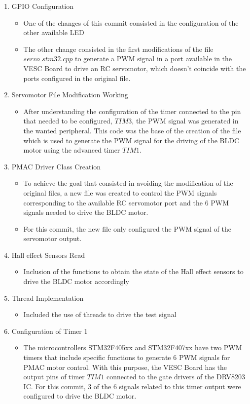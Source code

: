 \begin{enumerate}
	\item GPIO Configuration
		\begin {itemize}
			\item One of the changes of this commit consisted in the configuration of the other available LED
			\item The other change consisted in the first modifications of the file $servo\_stm32.cpp$ to generate a PWM signal in a port available in the VESC Board to drive an RC servomotor, which doesn't coincide with the ports configured in the original file.
		\end {itemize}
	\item Servomotor File Modification Working
		\begin {itemize}
			\item After understanding the configuration of the timer connected to the pin that needed to be configured, $TIM3$, the PWM signal was generated in the wanted peripheral. This code was the base of the creation of the file which is used to generate the PWM signal for the driving of the BLDC motor using the advanced timer $TIM1$.
		\end {itemize}
	\item PMAC Driver Class Creation
		\begin {itemize}
			\item To achieve the goal that consisted in avoiding the modification of the original files, a new file was created to control the PWM signals corresponding to the available RC servomotor port and the 6 PWM signals needed to drive the BLDC motor.
			\item For this commit, the new file only configured the PWM signal of the servomotor output.
		\end {itemize}
	\item Hall effect Sensors Read
		\begin {itemize}
			\item Inclusion of the functions to obtain the state of the Hall effect sensors to drive the BLDC motor accordingly
		\end {itemize}
	\item Thread Implementation
		\begin {itemize}
			\item Included the use of threads to drive the test signal
		\end {itemize}
	\item Configuration of Timer 1
		\begin {itemize}
			\item The microcontrollers STM32F405xx and STM32F407xx have two PWM timers that include specific functions to generate 6 PWM signals for PMAC motor control. With this purpose, the VESC Board has the output pins of timer $TIM1$ connected to the gate drivers of the DRV8203 IC. For this commit, 3 of the 6 signals related to this timer output were configured to drive the BLDC motor.

\end{itemize}
\end{enumerate}
